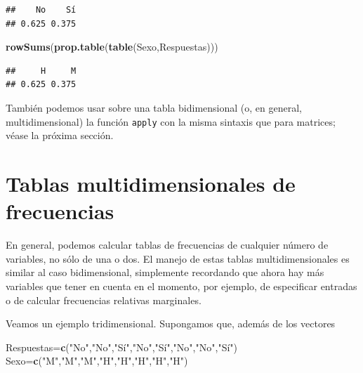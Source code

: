 \documentclass[]{book}
\newenvironment{Shaded}{\begin{snugshade}}{\end{snugshade}}
\newcommand{\KeywordTok}[1]{\textcolor[rgb]{0.13,0.29,0.53}{\textbf{#1}}}
\newcommand{\NormalTok}[1]{#1}
\newcommand{\StringTok}[1]{\textcolor[rgb]{0.31,0.60,0.02}{#1}}
\theoremstyle{definition}
\theoremstyle{definition}
\theoremstyle{definition}
\theoremstyle{remark}
\begin{document}
\begin{verbatim}
##    No    Sí 
## 0.625 0.375
\end{verbatim}

\begin{Shaded}
\begin{Highlighting}[]
\KeywordTok{rowSums}\NormalTok{(}\KeywordTok{prop.table}\NormalTok{(}\KeywordTok{table}\NormalTok{(Sexo,Respuestas)))}
\end{Highlighting}
\end{Shaded}

\begin{verbatim}
##     H     M 
## 0.625 0.375
\end{verbatim}

También podemos usar sobre una tabla bidimensional (o, en general, multidimensional) la función \texttt{apply}
con la misma sintaxis que para matrices; véase la próxima sección.

\hypertarget{tablas-multidimensionales-de-frecuencias}{%
\section{Tablas multidimensionales de frecuencias}\label{tablas-multidimensionales-de-frecuencias}}

En general, podemos calcular tablas de frecuencias de cualquier número de variables, no sólo de una o dos. El manejo de estas tablas multidimensionales es similar al caso bidimensional, simplemente recordando que ahora hay más variables que tener en cuenta en el momento, por ejemplo, de especificar entradas o de calcular frecuencias relativas marginales.

Veamos un ejemplo tridimensional. Supongamos que, además de los vectores

\begin{Shaded}
\begin{Highlighting}[]
\NormalTok{Respuestas=}\KeywordTok{c}\NormalTok{(}\StringTok{"No"}\NormalTok{,}\StringTok{"No"}\NormalTok{,}\StringTok{"Sí"}\NormalTok{,}\StringTok{"No"}\NormalTok{,}\StringTok{"Sí"}\NormalTok{,}\StringTok{"No"}\NormalTok{,}\StringTok{"No"}\NormalTok{,}\StringTok{"Sí"}\NormalTok{)}
\NormalTok{Sexo=}\KeywordTok{c}\NormalTok{(}\StringTok{"M"}\NormalTok{,}\StringTok{"M"}\NormalTok{,}\StringTok{"M"}\NormalTok{,}\StringTok{"H"}\NormalTok{,}\StringTok{"H"}\NormalTok{,}\StringTok{"H"}\NormalTok{,}\StringTok{"H"}\NormalTok{,}\StringTok{"H"}\NormalTok{) }
\end{Highlighting}
\end{Shaded}
\end{document}
